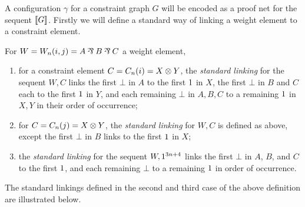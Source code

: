 \documentclass{lmcs}
\begin{document}
A configuration $\gamma$ for a constraint graph $G$ will be encoded as a proof net for the sequent $\llbracket G\rrbracket$.
%
Firstly we will define a standard way of linking a weight element to a constraint element.

                                                                                                                                                                                                                                                                                                                                                                                                                                                                                  
\begin{definition}
\label{def:standard linkings}
For $W=W_n(i,j)=A\parr B\parr C$ a weight element,
\begin{enumerate}
	\item
for a constraint element $C=C_n(i)=X\otimes Y$, the \emph{standard linking} for the sequent $W,C$ links the first $\bot$ in $A$ to the first $1$ in $X$, the first $\bot$ in $B$ and $C$ each to the first $1$ in $Y$, and each remaining $\bot$ in $A,B,C$ to a remaining $1$ in $X,Y$ in their order of occurrence;
	\item
for $C=C_n(j)=X\otimes Y$, the \emph{standard linking} for $W,C$ is defined as above, except the first $\bot$ in $B$ links to the first $1$ in $X$;
	\item
the \emph{standard linking} for the sequent $W,1^{3n+4}$ links the first $\bot$ in $A$, $B$, and $C$ to the first $1$, and each remaining $\bot$ to a remaining $1$ in order of occurrence.
\end{enumerate}
\end{definition}

The standard linkings defined in the second and third case of the above definition are illustrated below.
\end{document}

